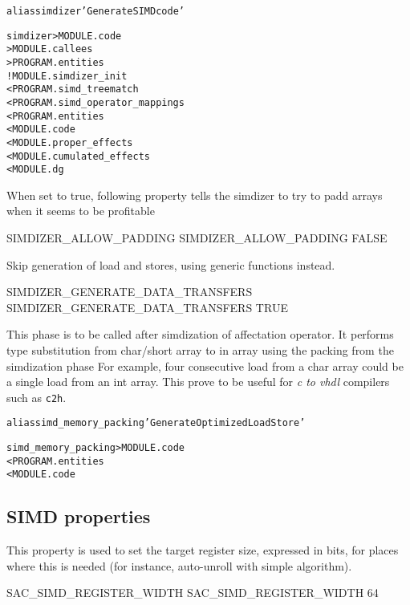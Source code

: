 \documentclass[a4paper]{report}
\newenvironment{PipsMake}{\begin{alltt}}{\end{alltt}}
\newenvironment{PipsPass}[1]{\label{pass:#1}}{}
\begin{document}
\begin{PipsMake}
alias simdizer 'Generate SIMD code'

simdizer                    > MODULE.code
                            > MODULE.callees
                            > PROGRAM.entities
		! MODULE.simdizer_init
		< PROGRAM.simd_treematch
		< PROGRAM.simd_operator_mappings
        < PROGRAM.entities
        < MODULE.code
        < MODULE.proper_effects
        < MODULE.cumulated_effects
        < MODULE.dg
\end{PipsMake}

When set to true, following property tells the simdizer to try to padd arrays when it seems to be profitable
\begin{PipsProp}{SIMDIZER_ALLOW_PADDING}
SIMDIZER_ALLOW_PADDING FALSE
\end{PipsProp}

Skip generation of load and stores, using generic functions instead.
\begin{PipsProp}{SIMDIZER_GENERATE_DATA_TRANSFERS}
SIMDIZER_GENERATE_DATA_TRANSFERS TRUE
\end{PipsProp}

\begin{PipsPass}{simd_memory_packing}
This phase is to be called after simdization of affectation operator.
It performs type substitution from char/short array to in array
using the packing from the simdization phase
For example, four consecutive load from a char array could be a single load from an int array.
This prove to be useful for \textit{c to vhdl} compilers such as \texttt{c2h}.
\end{PipsPass}

\begin{PipsMake}
alias simd_memory_packing 'Generate Optimized Load Store'

simd_memory_packing  > MODULE.code
        < PROGRAM.entities
        < MODULE.code
\end{PipsMake}

\subsection{SIMD properties}

This property is used to set the target register size, expressed in
bits, for places where this is needed (for instance, auto-unroll with
simple algorithm).

\begin{PipsProp}{SAC_SIMD_REGISTER_WIDTH}
SAC_SIMD_REGISTER_WIDTH 64
\end{PipsProp}
\end{document}
